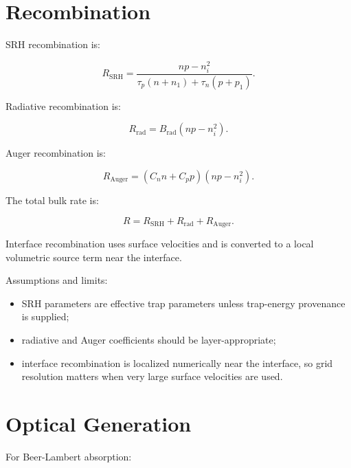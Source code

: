 \documentclass[
  11pt,
  american,
]{report}
\providecommand{\tightlist}{%
  \setlength{\itemsep}{0pt}\setlength{\parskip}{0pt}}
\begin{document}
\hypertarget{recombination}{%
\section{Recombination}\label{recombination}}

SRH recombination is:

\begin{equation}
\label{eq:srh}
R_\mathrm{SRH}
=
\frac{np-n_i^2}
{\tau_p(n+n_1)+\tau_n(p+p_1)} .
\end{equation}

Radiative recombination is:

\begin{equation}
\label{eq:radiative}
R_\mathrm{rad}=B_\mathrm{rad}(np-n_i^2).
\end{equation}

Auger recombination is:

\begin{equation}
\label{eq:auger}
R_\mathrm{Auger}
=(C_n n+C_p p)(np-n_i^2).
\end{equation}

The total bulk rate is:

\begin{equation}
\label{eq:total-recombination}
R=R_\mathrm{SRH}+R_\mathrm{rad}+R_\mathrm{Auger}.
\end{equation}

Interface recombination uses surface velocities and is converted to a
local volumetric source term near the interface.

Assumptions and limits:

\begin{itemize}
\tightlist
\item
  SRH parameters are effective trap parameters unless trap-energy
  provenance is supplied;
\item
  radiative and Auger coefficients should be layer-appropriate;
\item
  interface recombination is localized numerically near the interface,
  so grid resolution matters when very large surface velocities are
  used.
\end{itemize}

\hypertarget{optical-generation}{%
\section{Optical Generation}\label{optical-generation}}

For Beer-Lambert absorption:
\end{document}
